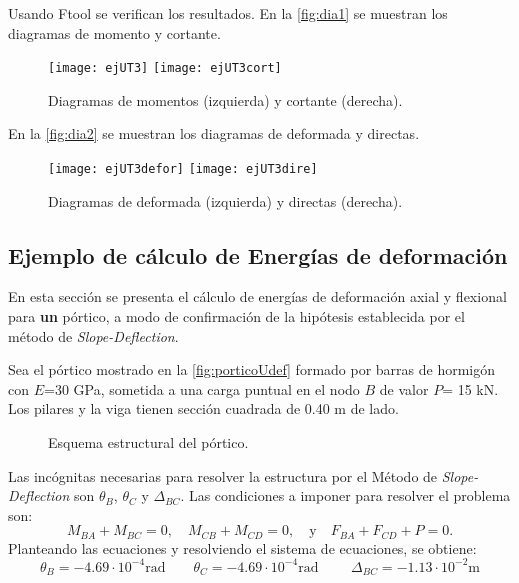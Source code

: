 Usando Ftool se verifican los resultados. En la \autoref{fig:dia1} se muestran los diagramas de momento y cortante.
\begin{figure}[htb]
	\centering
	\texttt{[image: ejUT3]}
	\texttt{[image: ejUT3cort]}
	\caption{Diagramas de momentos (izquierda) y cortante (derecha).}
	\label{fig:dia1}
\end{figure}

En la \autoref{fig:dia2} se muestran los diagramas de deformada y directas.
\begin{figure}[htb]
	\centering
	\texttt{[image: ejUT3defor]}
	\texttt{[image: ejUT3dire]}
	\caption{Diagramas de deformada (izquierda) y directas (derecha).}
	\label{fig:dia2}
\end{figure}


\clearpage

\subsection{Ejemplo de cálculo de Energías de deformación} \label{sec:ejenergdef}

En esta sección se presenta el cálculo de energías de deformación axial y flexional para \textbf{un} pórtico, a modo de confirmación de la hipótesis establecida por el método de \textit{Slope-Deflection}.

Sea el pórtico mostrado en la \autoref{fig:porticoUdef} formado por barras de hormigón con $E$=30 GPa, sometida a una carga puntual en el nodo $B$ de valor $P$= 15 kN. Los pilares y la viga tienen sección cuadrada de 0.40 m de lado.

\begin{figure}[htb]
	\centering
	\def\svgwidth{0.6\textwidth}
	
	\caption{Esquema estructural del pórtico.}
	\label{fig:porticoUdef}
\end{figure}

Las incógnitas necesarias para resolver la estructura por el Método de \textit{Slope-Deflection} son $\theta_B$,  $\theta_C$ y $\Delta_{BC}$. Las condiciones a imponer para resolver el problema son:
%
\begin{equation}
M_{BA}+M_{BC} = 0, \quad  M_{CB}+M_{CD} = 0, \quad \text{y} \quad 		F_{BA}+F_{CD} + P = 0.
\end{equation}
%
Planteando las ecuaciones y resolviendo el sistema de ecuaciones, se obtiene:
%
\begin{equation}
	\boxed{
	\theta_B = -4.69\cdot 10^{-4} \text{rad} \qquad \theta_C = -4.69\cdot 10^{-4} \text{rad }\qquad \Delta_{BC} = -1.13\cdot 10^{-2} \text{m}}
\end{equation}

